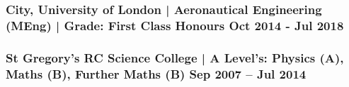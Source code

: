 \documentclass[a4paper, 10pt]{article}
\begin{document}
\subsubsection*{\textbf {City, University of London | Aeronautical Engineering (MEng)} | Grade: First Class Honours   \hfill \textbf{Oct 2014 - Jul 2018}}\FloatBarrier

\vspace{-1.5mm}

\subsubsection*{\textbf{St Gregory’s RC Science College} | A Level's: Physics (A), Maths (B), Further Maths (B) \hfill  \textbf{Sep 2007 – Jul 2014}}

\vspace{1.0mm}
{\titlerule[1.0pt]}

\date{}
\end{document}
